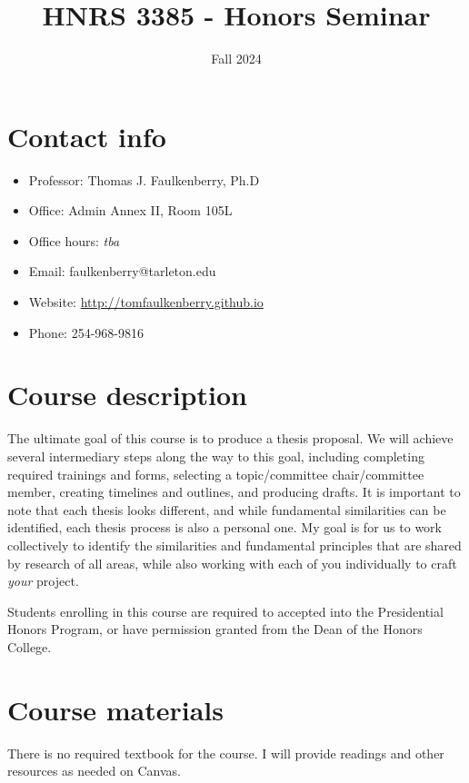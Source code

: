 \documentclass[10pt]{article}
\date{Fall 2024}
\title{HNRS 3385 - Honors Seminar}
\begin{document}
\maketitle

\section*{Contact info}
\label{sec:orgda3de57}
\begin{itemize}
\item Professor: Thomas J. Faulkenberry, Ph.D
\item Office: Admin Annex II, Room 105L
\item Office hours: \emph{tba}
\item Email: faulkenberry@tarleton.edu
\item Website: \url{http://tomfaulkenberry.github.io}
\item Phone: 254-968-9816
\end{itemize}

\section*{Course description}
\label{sec:org6883ba3}

The ultimate goal of this course is to produce a thesis proposal. We will achieve several intermediary steps along the way to this goal, including completing required trainings and forms, selecting a topic/committee chair/committee member, creating timelines and outlines, and producing drafts. It is important to note that each thesis looks different, and while fundamental similarities can be identified, each thesis process is also a personal one. My goal is for us to work collectively to identify the similarities and fundamental principles that are shared by research of all areas, while also working with each of you individually to craft \emph{your} project.

Students enrolling in this course are required to accepted into the Presidential Honors Program, or have permission granted from the Dean of the Honors College.

\section*{Course materials}
\label{sec:org37bf40f}

There is no required textbook for the course. I will provide readings and other resources as needed on Canvas.
\end{document}
